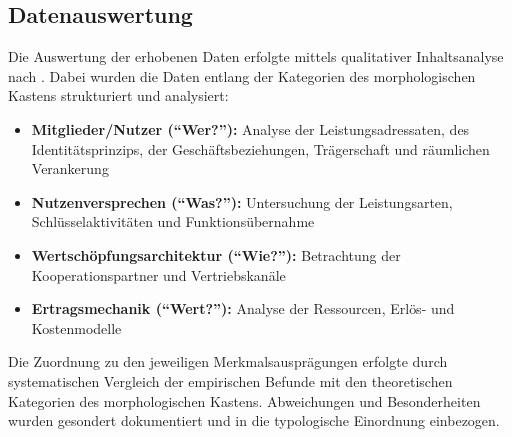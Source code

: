 \subsection{Datenauswertung}

Die Auswertung der erhobenen Daten erfolgte mittels qualitativer Inhaltsanalyse nach \textcite{mayringQualitativeInhaltsanalyseGrundlagen2022}. Dabei wurden die Daten entlang der Kategorien des morphologischen Kastens strukturiert und analysiert:

\begin{itemize}
\item \textbf{Mitglieder/Nutzer (\enquote{Wer?}):} Analyse der Leistungsadressaten, des Identitätsprinzips, der Geschäftsbeziehungen, Trägerschaft und räumlichen Verankerung
\item \textbf{Nutzenversprechen (\enquote{Was?}):} Untersuchung der Leistungsarten, Schlüsselaktivitäten und Funktionsübernahme
\item \textbf{Wertschöpfungsarchitektur (\enquote{Wie?}):} Betrachtung der Kooperationspartner und Vertriebskanäle
\item \textbf{Ertragsmechanik (\enquote{Wert?}):} Analyse der Ressourcen, Erlös- und Kostenmodelle
\end{itemize}

Die Zuordnung zu den jeweiligen Merkmalsausprägungen erfolgte durch systematischen Vergleich der empirischen Befunde mit den theoretischen Kategorien des morphologischen Kastens. Abweichungen und Besonderheiten wurden gesondert dokumentiert und in die typologische Einordnung einbezogen.
